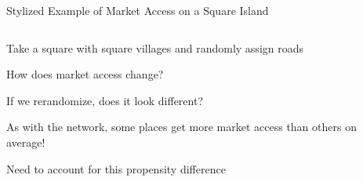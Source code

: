 \documentclass[notes,11pt, aspectratio=169]{beamer}
\newenvironment{wideitemize}{\itemize\addtolength{\itemsep}{10pt}}{\enditemize}
\begin{document}
\begin{frame}{ Stylized Example of Market Access on a Square Island}
\begin{columns}[T] %
\begin{column}{.55\textwidth}
  \begin{wideitemize}
  \item Take a square with square villages and randomly assign roads
  \item How does market access change?
  \item<2-> If we rerandomize, does it look different?
  \item<3-> As with the network, some places get more market access than others on average!
    \item<3-> Need to account for this propensity difference
  \end{wideitemize}
\end{column}%
\hfill%
\begin{column}{.45\textwidth}
\end{column}%
\end{columns}
\end{frame}
\end{document}
